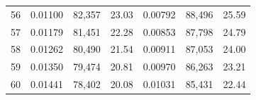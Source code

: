 \begin{tabular}{cccc|ccc}
56   & 0.01100                                                          & 82,357                                                                                            & 23.03                                                                                                                      & 0.00792                                                          & 88,496                                                                                            & 25.59                                                                                                                      \\
57   & 0.01179                                                          & 81,451                                                                                            & 22.28                                                                                                                      & 0.00853                                                          & 87,798                                                                                            & 24.79                                                                                                                      \\
58   & 0.01262                                                          & 80,490                                                                                            & 21.54                                                                                                                      & 0.00911                                                          & 87,053                                                                                            & 24.00                                                                                                                      \\
59   & 0.01350                                                          & 79,474                                                                                            & 20.81                                                                                                                      & 0.00970                                                          & 86,263                                                                                            & 23.21                                                                                                                      \\
60   & 0.01441                                                          & 78,402                                                                                            & 20.08                                                                                                                      & 0.01031                                                          & 85,431                                                                                            & 22.44                                                                                                                      \\

\end{tabular}
